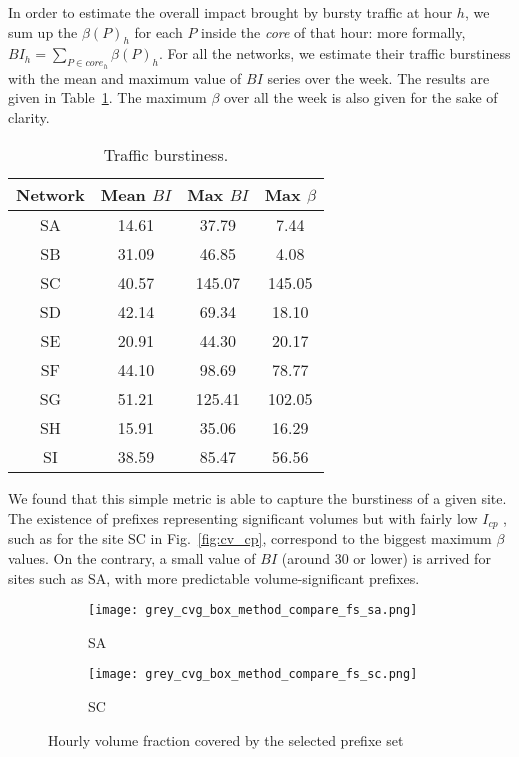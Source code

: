 \documentclass[10pt, conference,letterpaper]{IEEEtran}
\begin{document}
In order to estimate the overall impact brought by bursty traffic at hour $h$, we sum up the $\beta(P)_h$ for each $P$ inside the \textit{core} of that hour: more formally, 
$BI_h = \sum_{P \in \textit{core}_h} \beta(P)_h$.
For all the networks, we estimate their traffic burstiness with the mean and maximum value of $BI$ series over the week. The results are given in Table~\ref{tab:bi}. The maximum $\beta$ over all the week is also given for the sake of clarity.
\begin{table}[!tb]
\centering
\begin{tabular}{cccc}\toprule
\textbf{Network} & \textbf{Mean $BI$} & \textbf{Max $BI$} & \textbf{Max $\beta$}\\
\midrule
SA & 14.61 & 37.79  &  7.44\\
SB & 31.09 & 46.85  &  4.08\\
SC & 40.57 & 145.07 &  145.05\\
SD & 42.14 & 69.34  &  18.10\\
SE & 20.91 & 44.30  &  20.17\\
SF & 44.10 & 98.69  &  78.77\\
SG & 51.21 & 125.41 &  102.05\\
SH & 15.91 & 35.06  &  16.29\\
SI & 38.59 & 85.47  &  56.56\\
\bottomrule
\end{tabular}
\caption{Traffic burstiness.}
\label{tab:bi}
\end{table}




We found that this simple metric is able to capture the burstiness of a given site. The existence of prefixes representing significant volumes but with fairly low $I_{cp}$ , such as for the site SC in Fig.~\ref{fig:cv_cp}, correspond to the biggest maximum $\beta$ values.
On the contrary, a small value of $BI$ (around 30 or lower) is arrived for sites such as SA, with more predictable volume-significant prefixes.

\begin{figure*}[!ht]
		\centering
        \begin{subfigure}[b]{0.49\textwidth}
                \centering                                        \texttt{[image: grey\_cvg\_box\_method\_compare\_fs\_sa.png]}
                \caption{SA}
                \label{fig:cvg_sa}
        \end{subfigure}
        \hfill
        \begin{subfigure}[b]{0.49\textwidth}
                \centering                \texttt{[image: grey\_cvg\_box\_method\_compare\_fs\_sc.png]}
                \caption{SC}
                \label{fig:cvg_sc}
        \end{subfigure}
\caption{Hourly volume fraction covered by the selected prefixe set}
\label{fig:cvg}
\end{figure*}
\end{document}
